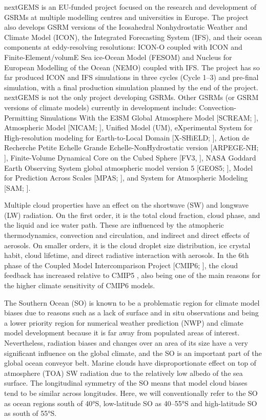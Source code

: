 \documentclass[12pt,a4paper]{article}
\begin{document}
nextGEMS is an EU-funded project \citep{nextgems} focused on the research and
development of GSRMs at multiple modelling centres and universities in Europe.
The project also develops GSRM versions of the Icosahedral Nonhydrostatic
Weather and Climate Model (ICON), the Integrated Forecasting System (IFS), and
their ocean components at eddy-resolving resolutions: ICON-O coupled with ICON
and Finite-Element/volumE Sea ice-Ocean Model (FESOM) and Nucleus for European
Modelling of the Ocean (NEMO) coupled with IFS.  The project has so far
produced ICON and IFS simulations in three cycles (Cycle 1--3) and pre-final
simulation, with a final production simulation planned by the end of the
project. nextGEMS is not the only project developing GSRMs. Other GSRMs (or
GSRM versions of climate models) currently in development include:
Convection-Permitting Simulations With the E3SM Global Atmosphere Model
[SCREAM; \cite{caldwell2021}], Atmospheric Model [NICAM; \cite{satoh2008}],
Unified Model (UM), eXperimental System for High-resolution modeling for
Earth-to-Local Domain [X-SHiELD; \cite{shield}], Action de Recherche Petite
Echelle Grande Echelle-NonHydrostatic version [ARPEGE-NH;
\cite{bubnova1995,voldoire2017}], Finite-Volume Dynamical Core on the Cubed
Sphere [FV3, \cite{lin2004}], NASA Goddard Earth Observing System global
atmospheric model version 5 [GEOS5; \cite{putman2011}], Model for Prediction
Across Scales [MPAS; \cite{skamarock2012}], and System for Atmospheric Modeling
[SAM; \cite{khairoutdinov2003}].

Multiple cloud properties have an effect on the shortwave (SW) and longwave
(LW) radiation. On the first order, it is the total cloud fraction, cloud phase,
and the liquid and ice water path. These are influenced by the atmopheric
thermodynamics, convection and circulation, and indirect and direct effects
of aerosols. On smaller orders, it is the cloud droplet size distribution, ice
crystal habit, cloud lifetime, and direct radiative interaction with aerosols.
In the 6th phase of the Coupled Model Intercomparison Project [CMIP6;
\citep{eyring2016}], the cloud feedback has increased relative to CMIP5
\citep{zelinka2020}, also being one of the main reasons for the higher climate
sensitivity of CMIP6 models.

The Southern Ocean (SO) is known to be a problematic region for climate model
biases due to reasons such as a lack of surface and in situ observations and
being a lower priority region for numerical weather prediction (NWP) and
climate model development because it is far away from populated areas of
interest.  Nevertheless, radiation biases and changes over an area of its size
have a very significant influence on the global climate, and the SO is an
important part of the global ocean conveyor belt.  Marine clouds have
disproportionate effect on top of atmosphere (TOA) SW radiation due to the
relatively low albedo of the sea surface.  The longitudinal symmetry of the SO
means that model cloud biases tend to be similar across longitudes.  Here, we
will conventionally refer to the SO as ocean regions south of 40°S,
low-latitude SO as 40--55°S and high-latitude SO as south of
55°S.
\end{document}
